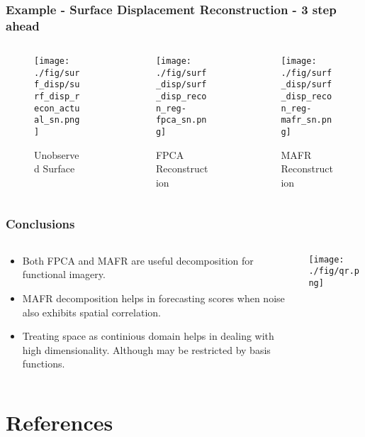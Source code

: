 \documentclass[aspectratio=169]{beamer}
\begin{document}
  \begin{frame}
    \frametitle{Example - Surface Displacement Reconstruction - 3 step ahead}
    \begin{columns}[t]
      \begin{column}{.33\textwidth}
      \begin{figure}
        \texttt{[image: ./fig/surf\_disp/surf\_disp\_recon\_actual\_sn.png]}
      \caption{Unobserved Surface}
      \end{figure}
      \end{column}
      \begin{column}{.33\textwidth}
      \begin{figure}
      \texttt{[image: ./fig/surf\_disp/surf\_disp\_recon\_reg-fpca\_sn.png]}
      \caption{FPCA Reconstruction}
      \end{figure}
      \end{column}
      \begin{column}{.33\textwidth}
      \begin{figure}
      \texttt{[image: ./fig/surf\_disp/surf\_disp\_recon\_reg-mafr\_sn.png]}
      \caption{MAFR Reconstruction}
      \end{figure}
      \end{column}
    \end{columns}
  \end{frame}
  

  \begin{frame}
    \frametitle{Conclusions}
    \begin{columns}
      \begin{column}{0.5\textwidth}
        \begin{itemize}
          \item Both FPCA and MAFR are useful decomposition for functional imagery.
          \item MAFR decomposition helps in forecasting scores when noise also exhibits spatial correlation. 
          \item Treating space as continious domain helps in dealing with high dimensionality. Although may be restricted by basis functions. 
        \end{itemize}
      \end{column}
      \begin{column}{0.5\textwidth}
        \begin{center}
          \texttt{[image: ./fig/qr.png]}
        \end{center}
      \end{column}
    \end{columns}
    
  \end{frame}
  

  \section{References}
  \begin{frame}[allowframebreaks]
  \frametitle{\secname}
  \tiny{}
  \end{frame}
\end{document}
